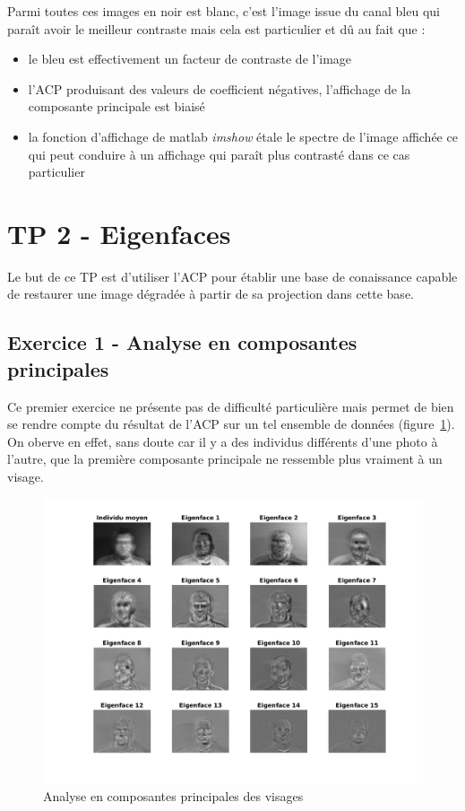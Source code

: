 \documentclass{article}
\begin{document}
Parmi toutes ces images en noir est blanc, c'est l'image issue du canal bleu qui paraît avoir le meilleur contraste mais cela est particulier et dû au fait que :
\begin{itemize}
    \item le bleu est effectivement un facteur de contraste de l'image
    \item l'ACP produisant des valeurs de coefficient négatives, l'affichage de la composante principale est biaisé
    \item la fonction d'affichage de matlab \emph{imshow} étale le spectre de l'image affichée ce qui peut conduire à un affichage qui paraît plus contrasté dans ce cas particulier
\end{itemize}
\clearpage
\section{TP 2 - Eigenfaces}
Le but de ce TP est d'utiliser l'ACP pour établir une base de conaissance capable de restaurer une image dégradée à partir de sa projection dans cette base.
\subsection{Exercice 1 - Analyse en composantes principales}
Ce premier exercice ne présente pas de difficulté particulière mais permet de bien se rendre compte  du résultat de l'ACP sur un tel ensemble de données (figure~\ref{acp_faces}). On oberve en effet, sans doute car il y a des individus différents d'une photo à l'autre, que la première composante principale ne ressemble plus vraiment à un visage.
\begin{figure}[!ht]
    \begin{center}
        \includegraphics[width=0.9\linewidth]{images/2-acp_faces.png}
        \caption{Analyse en composantes principales des visages}
        \label{acp_faces}
    \end{center}
\end{figure}
\end{document}

